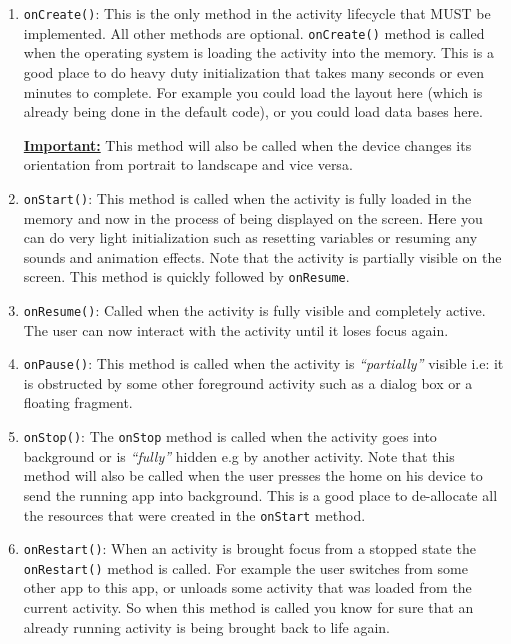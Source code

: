\begin{enumerate}
	\item \texttt{onCreate()}: This is the only method in the activity lifecycle that MUST be implemented. All other methods are optional. \texttt{onCreate()} method is called when the operating system is loading the activity into the memory. This is a good place to do heavy duty initialization that takes many seconds or even minutes to complete. For example you could load the layout here (which is already being done in the default code), or you could load data bases here.
	
	\textbf{\underline{Important:}} This method will also be called when the device changes its orientation from portrait to landscape and vice versa. 
	
	\item \texttt{onStart()}: This method is called when the activity is fully loaded in the memory and now in the process of being displayed on the screen. Here you can do very light initialization such as resetting variables or resuming any sounds and animation effects. Note that the activity is partially visible on the screen. This method is quickly followed by \texttt{onResume}.
	
	\item \texttt{onResume()}: Called when the activity is fully visible and completely active. The user can now interact with the activity until it loses focus again.
	
	\item \texttt{onPause()}: This method is called when the activity is \textit{``partially''} visible i.e: it is obstructed by some other foreground activity such as a dialog box or a floating fragment. 
	
	\item \texttt{onStop()}: The \texttt{onStop} method is called when the activity goes into background or is \textit{``fully''} hidden e.g by another activity. Note that this method will also be called when the user presses the home on his device to send the running app into background. This is a good place to de-allocate all the resources that were created in the \texttt{onStart} method.
	
	\item \texttt{onRestart()}: When an activity is brought focus from a stopped state the \texttt{onRestart()} method is called. For example the user switches from some other app to this app, or unloads some activity that was loaded from the current activity. So when this method is called you know for sure that an already running activity is being brought back to life again.
	

\end{enumerate}
